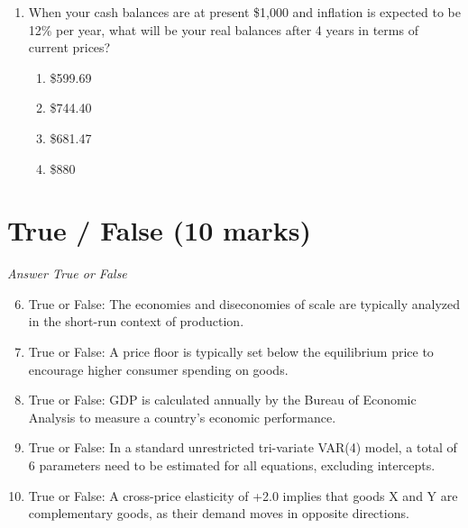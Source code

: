 \documentclass[12pt]{article}
\begin{document}
\begin{enumerate}[label=\arabic*.]
\begin{enumerate}[label=(\alph*)]
    \item Interest is the penalty for early consumption
    \item Interest is the reward for immediate consumption
    \item Interest is a fee charged by banks independent of market forces
    \item Interest rates fluctuate based on the phases of the moon
    \item Interest is a tax on savings that discourages postponing consumption
\end{enumerate}
\item When your cash balances are at present \$1,000 and inflation is expected to be 12\% per year, what will be your real balances after 4 years in terms of current prices?
\begin{enumerate}[label=(\alph*)]
    \item \$599.69
    \item \$744.40
    \item \$681.47
    \item \$880
\end{enumerate}
\end{enumerate}

\section*{True / False (10 marks)}
\textit{Answer True or False}
\begin{enumerate}[label=\arabic*.]
\setcounter{enumi}{5}
\item True or False: The economies and diseconomies of scale are typically analyzed in the short-run context of production.
\item True or False: A price floor is typically set below the equilibrium price to encourage higher consumer spending on goods.
\item True or False: GDP is calculated annually by the Bureau of Economic Analysis to measure a country's economic performance.
\item True or False: In a standard unrestricted tri-variate VAR(4) model, a total of 6 parameters need to be estimated for all equations, excluding intercepts.
\item True or False: A cross-price elasticity of +2.0 implies that goods X and Y are complementary goods, as their demand moves in opposite directions.
\end{enumerate}
\end{document}
